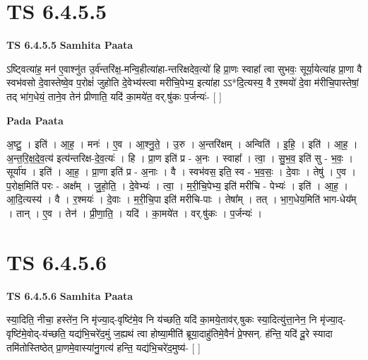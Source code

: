 \documentclass[17pt]{extarticle}
\begin{document}
\section*{ TS 6.4.5.5 }

\textbf{TS 6.4.5.5 } \newline
\textbf{Samhita Paata} \newline

ऽष्ट्वित्या॑ह॒ मन॑ ए॒वाश्नु॑त उ॒र्व॑न्तरि॑क्ष॒-मन्वि॒हीत्या॑हा-न्तरिक्षदेव॒त्यो॑ हि प्रा॒णः स्वाहा᳚ त्वा सुभवः॒ सूर्या॒येत्या॑ह प्रा॒णा वै स्वभ॑वसो दे॒वास्तेष्वे॒व प॒रोक्षं॑ जुहोति दे॒वेभ्य॑स्त्वा मरीचि॒पेभ्य॒ इत्या॑हा ऽऽ*दि॒त्यस्य॒ वै र॒श्मयो॑ दे॒वा म॑रीचि॒पास्तेषां॒ तद् भा॑ग॒धेयं॒ ताने॒व तेन॑ प्रीणाति॒ यदि॑ का॒मये॑त॒ वर्.षु॑कः प॒र्जन्यः॑- [  ] \newline

\textbf{Pada Paata} \newline

अ॒ष्टु॒ । इति॑ । आ॒ह॒ । मनः॑ । ए॒व । आ॒श्नु॒ते॒ । उ॒रु । अ॒न्तरि॑क्षम् । अन्विति॑ । इ॒हि॒ । इति॑ । आ॒ह॒ । अ॒न्त॒रि॒क्ष॒दे॒व॒त्य॑ इत्य॑न्तरिक्ष-दे॒व॒त्यः॑ । हि । प्रा॒ण इति॑ प्र - अ॒नः । स्वाहा᳚ । त्वा॒ । सु॒भ॒व॒ इति॑ सु - भ॒वः॒ । सूर्या॑य । इति॑ । आ॒ह॒ । प्रा॒णा इति॑ प्र - अ॒नाः । वै । स्वभ॑वस॒ इति॒ स्व - भ॒व॒सः॒ । दे॒वाः । तेषु॑ । ए॒व । प॒रोक्ष॒मिति॑ परः - अक्ष᳚म् । जु॒हो॒ति॒ । दे॒वेभ्यः॑ । त्वा॒ । म॒री॒चि॒पेभ्य॒ इति॑ मरीचि - पेभ्यः॑ । इति॑ । आ॒ह॒ । आ॒दि॒त्यस्य॑ । वै । र॒श्मयः॑ । दे॒वाः । म॒री॒चि॒पा इति॑ मरीचि-पाः । तेषा᳚म् । तत् । भा॒ग॒धेय॒मिति॑ भाग-धेय᳚म् । तान् । ए॒व । तेन॑ । प्री॒णा॒ति॒ । यदि॑ । का॒मये॑त । वर्.षु॑कः । प॒र्जन्यः॑ ।  \newline




\section*{ TS 6.4.5.6 }

\textbf{TS 6.4.5.6 } \newline
\textbf{Samhita Paata} \newline

स्या॒दिति॒ नीचा॒ हस्ते॑न॒ नि मृ॑ज्या॒द्-वृष्टि॑मे॒व नि य॑च्छति॒ यदि॑ का॒मये॒ताव॑र्.षुकः स्या॒दित्यु॑त्ता॒नेन॒ नि मृ॑ज्या॒द्-वृष्टि॑मे॒वोद्-य॑च्छति॒ यद्य॑भि॒चरे॑द॒मुं ज॒ह्यथ॑ त्वा होष्या॒मीति॑ ब्रूया॒दाहु॑तिमे॒वैनं॑ प्रे॒फ्सन्. ह॑न्ति॒ यदि॑ दू॒रे स्यादा तमि॑तोस्तिष्ठेत् प्रा॒णमे॒वास्या॑नु॒गत्य॑ हन्ति॒ यद्य॑भि॒चरे॑द॒मुष्य॑- [  ] \newline
\end{document}

